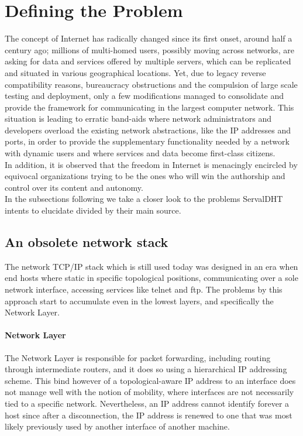 \documentclass[12pt,a4paper,oneside]{article}
\begin{document}
\section{Defining the Problem}
\label{problemdefinition}
The concept of Internet has radically changed since its first onset, around half a century ago; millions of multi-homed users, possibly moving across networks, are asking for data and services offered by multiple servers, which can be replicated and situated in various geographical locations.
Yet, due to legacy reverse compatibility reasons, bureaucracy obstructions and the compulsion of large scale testing and deployment, only a few modifications managed to consolidate and provide the framework for communicating in the largest computer network.
This situation is leading to erratic band-aids where network administrators and developers overload the existing network abstractions, like the IP  addresses and ports, in order to provide the supplementary functionality needed by a network with dynamic users and where services and data become first-class citizens.\\
\indent In addition, it is observed that the freedom in Internet is menacingly encircled by equivocal organizations trying to be the ones who will win the authorship and control over its content and autonomy.\\
\indent In the subsections following we take a closer look to the problems ServalDHT intents to elucidate divided by their main source.

\subsection{An obsolete network stack}
The network TCP/IP  stack which is still used today was designed in an era when end hosts where static in specific topological positions, communicating over a sole network interface, accessing services like telnet and ftp.
The problems by this approach start to accumulate even in the lowest layers, and specifically the Network Layer.
\paragraph{Network Layer} The Network Layer is responsible for packet forwarding, including routing through intermediate routers, and it does so using a hierarchical IP addressing scheme.
This bind however of a topological-aware IP address to an interface does not manage well with the notion of mobility, where interfaces are not necessarily tied to a specific network.
Nevertheless, an IP address cannot identify forever a host since after a disconnection, the IP address is renewed to one that was most likely previously used by another interface of another machine.
\pagebreak
\end{document}
